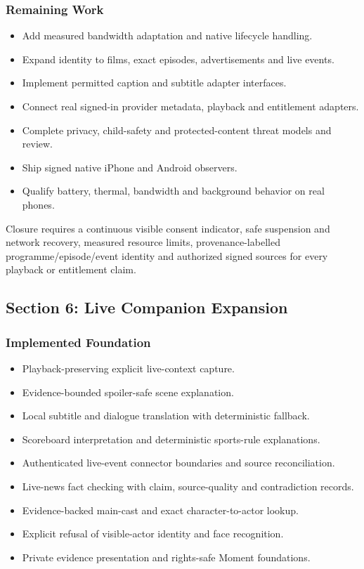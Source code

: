 \subsubsection{Remaining Work}

\begin{itemize}
  \item Add measured bandwidth adaptation and native lifecycle handling.
  \item Expand identity to films, exact episodes, advertisements and live events.
  \item Implement permitted caption and subtitle adapter interfaces.
  \item Connect real signed-in provider metadata, playback and entitlement adapters.
  \item Complete privacy, child-safety and protected-content threat models and review.
  \item Ship signed native iPhone and Android observers.
  \item Qualify battery, thermal, bandwidth and background behavior on real phones.
\end{itemize}

Closure requires a continuous visible consent indicator, safe suspension and network
recovery, measured resource limits, provenance-labelled programme/episode/event identity
and authorized signed sources for every playback or entitlement claim.

\subsection{Section 6: Live Companion Expansion}

\subsubsection{Implemented Foundation}

\begin{itemize}
  \item Playback-preserving explicit live-context capture.
  \item Evidence-bounded spoiler-safe scene explanation.
  \item Local subtitle and dialogue translation with deterministic fallback.
  \item Scoreboard interpretation and deterministic sports-rule explanations.
  \item Authenticated live-event connector boundaries and source reconciliation.
  \item Live-news fact checking with claim, source-quality and contradiction records.
  \item Evidence-backed main-cast and exact character-to-actor lookup.
  \item Explicit refusal of visible-actor identity and face recognition.
  \item Private evidence presentation and rights-safe Moment foundations.
\end{itemize}

